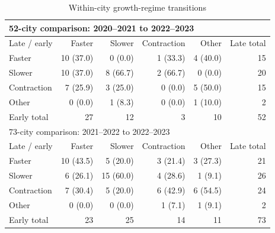 \begin{table}[htbp]\centering\small\setlength{\tabcolsep}{4pt}\caption{Within-city growth-regime transitions}\label{tab:growth_transition_details}
\begin{tabular}{@{}lrrrrr@{}}\toprule
\multicolumn{6}{l}{52-city comparison: 2020--2021 to 2022--2023}\\\midrule
Late / early & Faster & Slower & Contraction & Other & Late total\\
Faster & 10 (37.0) & 0 (0.0) & 1 (33.3) & 4 (40.0) & 15\\
Slower & 10 (37.0) & 8 (66.7) & 2 (66.7) & 0 (0.0) & 20\\
Contraction & 7 (25.9) & 3 (25.0) & 0 (0.0) & 5 (50.0) & 15\\
Other & 0 (0.0) & 1 (8.3) & 0 (0.0) & 1 (10.0) & 2\\
Early total & 27 & 12 & 3 & 10 & 52\\
\midrule
\multicolumn{6}{l}{73-city comparison: 2021--2022 to 2022--2023}\\\midrule
Late / early & Faster & Slower & Contraction & Other & Late total\\
Faster & 10 (43.5) & 5 (20.0) & 3 (21.4) & 3 (27.3) & 21\\
Slower & 6 (26.1) & 15 (60.0) & 4 (28.6) & 1 (9.1) & 26\\
Contraction & 7 (30.4) & 5 (20.0) & 6 (42.9) & 6 (54.5) & 24\\
Other & 0 (0.0) & 0 (0.0) & 1 (7.1) & 1 (9.1) & 2\\
Early total & 23 & 25 & 14 & 11 & 73\\
\midrule
\bottomrule\end{tabular}\end{table}\FloatBarrier
